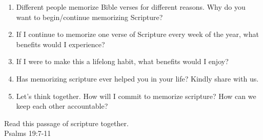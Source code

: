 \documentclass[
  letterpaper,
  DIV=11,
  numbers=noendperiod]{scrartcl}
\begin{document}
\begin{enumerate}
\def\labelenumi{\arabic{enumi}.}
\item
  Different people memorize Bible verses for different reasons. Why do
  you\\
  want to begin/continue memorizing Scripture?
\item
  If I continue to memorize one verse of Scripture every week of the
  year, what\\
  benefits would I experience?
\item
  If I were to make this a lifelong habit, what benefits would I enjoy?
\item
  Has memorizing scripture ever helped you in your life? Kindly share
  with us.
\item
  Let's think together. How will I commit to memorize scripture? How can
  we\\
  keep each other accountable?
\end{enumerate}

Read this passage of scripture together.\\
Psalms 19:7-11
\end{document}
